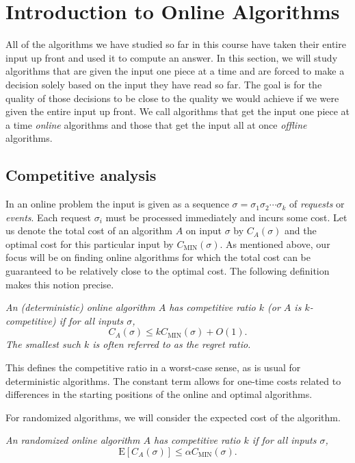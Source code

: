 \documentclass{article}
\begin{document}
\section{Introduction to Online Algorithms}

All of the algorithms we have studied so far in this course have
taken their entire input up front and used it to compute an
answer. In this section, we will study algorithms that are given
the input one piece at a time and are forced to make a decision
solely based on the input they have read so far. The goal is for
the quality of those decisions to be close to the quality we would
achieve if we were given the entire input up front. We call
algorithms that get the input one piece at a time \emph{online}
algorithms and those that get the input all at once \emph{offline}
algorithms.

\subsection{Competitive analysis}

In an online problem the input is given as a sequence
$\sigma=\sigma_1\sigma_2\cdots\sigma_k$ of \emph{requests} or
\emph{events}. Each request $\sigma_i$ must be processed
immediately and incurs some cost. Let us denote the total cost of
an algorithm $A$ on input $\sigma$ by $C_A(\sigma)$ and the
optimal cost for this particular input by
$C_{\mathrm{MIN}}(\sigma)$. As mentioned above, our focus will be
on finding online algorithms for which the total cost can be
guaranteed to be relatively close to the optimal cost. The
following definition makes this notion precise.

\begin{definition}\emph{
  An (deterministic) online algorithm $A$ has \emph{competitive ratio} $k$ (or
  $A$ is \emph{$k$-competitive}) if for all inputs $\sigma$,
  $$C_A(\sigma)\leq kC_{\mathrm{MIN}}(\sigma)+O(1).$$ The smallest such $k$ is often referred to as the \emph{regret ratio}.}
\end{definition}

This defines the competitive ratio in a worst-case sense, as is
usual for deterministic algorithms. The constant term allows for
one-time costs related to differences in the starting positions
of the online and optimal algorithms.

For randomized algorithms, we will consider the expected cost of the algorithm.

\begin{definition}\emph{
  An randomized online algorithm $A$ has \emph{competitive ratio} $k$ if for all inputs $\sigma$,
  $$\mathrm{E}[C_A(\sigma)]\leq \alpha
  C_{\mathrm{MIN}}(\sigma).$$}
\end{definition}
\end{document}
